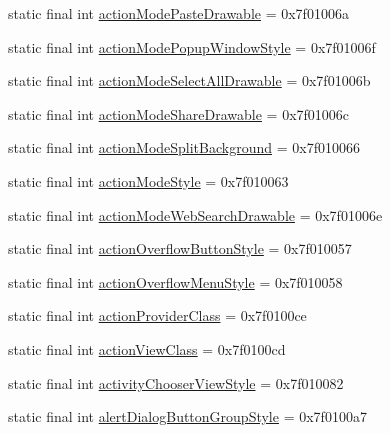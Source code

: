 \begin{CompactItemize}
\item 
static final int \hyperlink{classandroid_1_1support_1_1graphics_1_1drawable_1_1_r_1_1attr_a848c85aa9d95dd0350838960df2a3a1}{actionModePasteDrawable} = 0x7f01006a
\item 
static final int \hyperlink{classandroid_1_1support_1_1graphics_1_1drawable_1_1_r_1_1attr_2c1b5855e844733ff5e1e6984a921326}{actionModePopupWindowStyle} = 0x7f01006f
\item 
static final int \hyperlink{classandroid_1_1support_1_1graphics_1_1drawable_1_1_r_1_1attr_dd174a3dc818113c34b5471f650763ff}{actionModeSelectAllDrawable} = 0x7f01006b
\item 
static final int \hyperlink{classandroid_1_1support_1_1graphics_1_1drawable_1_1_r_1_1attr_56f5e9ccfff3a69875d5425a78f07560}{actionModeShareDrawable} = 0x7f01006c
\item 
static final int \hyperlink{classandroid_1_1support_1_1graphics_1_1drawable_1_1_r_1_1attr_d1ccc6fdb8f0fdcbcdf5ecce9be60509}{actionModeSplitBackground} = 0x7f010066
\item 
static final int \hyperlink{classandroid_1_1support_1_1graphics_1_1drawable_1_1_r_1_1attr_6025acc3631f491a122c24ad2245c047}{actionModeStyle} = 0x7f010063
\item 
static final int \hyperlink{classandroid_1_1support_1_1graphics_1_1drawable_1_1_r_1_1attr_299adda7c189c3b8410840d9c7be6fb9}{actionModeWebSearchDrawable} = 0x7f01006e
\item 
static final int \hyperlink{classandroid_1_1support_1_1graphics_1_1drawable_1_1_r_1_1attr_71f74c698f789316e83965cfd74023fb}{actionOverflowButtonStyle} = 0x7f010057
\item 
static final int \hyperlink{classandroid_1_1support_1_1graphics_1_1drawable_1_1_r_1_1attr_e988faf561bf47a6e086c4dfdeb98172}{actionOverflowMenuStyle} = 0x7f010058
\item 
static final int \hyperlink{classandroid_1_1support_1_1graphics_1_1drawable_1_1_r_1_1attr_febc4a5b8730f45bb8aef1c0f5a90fff}{actionProviderClass} = 0x7f0100ce
\item 
static final int \hyperlink{classandroid_1_1support_1_1graphics_1_1drawable_1_1_r_1_1attr_44a3d30c933cd2fced3c5c2447b1e5ef}{actionViewClass} = 0x7f0100cd
\item 
static final int \hyperlink{classandroid_1_1support_1_1graphics_1_1drawable_1_1_r_1_1attr_aaff13fdf428f6845b760aab8efa521e}{activityChooserViewStyle} = 0x7f010082
\item 
static final int \hyperlink{classandroid_1_1support_1_1graphics_1_1drawable_1_1_r_1_1attr_66dda8876a91412b5df5e41efc4e8b9b}{alertDialogButtonGroupStyle} = 0x7f0100a7

\end{CompactItemize}

